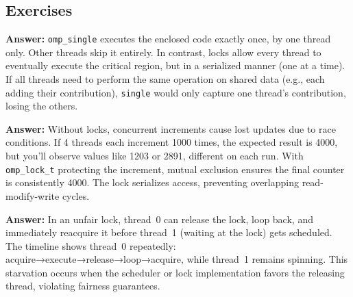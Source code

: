 \subsection{Exercises}

\begin{ppexercises}
  
  \textbf{Answer:} \texttt{omp\_single} executes the enclosed code exactly once, by one thread only. Other threads skip it entirely. In contrast, locks allow every thread to eventually execute the critical region, but in a serialized manner (one at a time). If all threads need to perform the same operation on shared data (e.g., each adding their contribution), \texttt{single} would only capture one thread's contribution, losing the others.
  
  
  \textbf{Answer:} Without locks, concurrent increments cause lost updates due to race conditions. If 4 threads each increment 1000 times, the expected result is 4000, but you'll observe values like 1203 or 2891, different on each run. With \texttt{omp\_lock\_t} protecting the increment, mutual exclusion ensures the final counter is consistently 4000. The lock serializes access, preventing overlapping read-modify-write cycles.
  
  
  \textbf{Answer:} In an unfair lock, thread~0 can release the lock, loop back, and immediately reacquire it before thread~1 (waiting at the lock) gets scheduled. The timeline shows thread~0 repeatedly: acquire→execute→release→loop→acquire, while thread~1 remains spinning. This starvation occurs when the scheduler or lock implementation favors the releasing thread, violating fairness guarantees.
  

\end{ppexercises}

